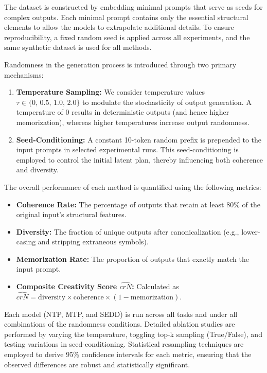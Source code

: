 \documentclass[12pt]{article}
\begin{document}
The dataset is constructed by embedding minimal prompts that serve as seeds for complex outputs. Each minimal prompt contains only the essential structural elements to allow the models to extrapolate additional details. To ensure reproducibility, a fixed random seed is applied across all experiments, and the same synthetic dataset is used for all methods.

Randomness in the generation process is introduced through two primary mechanisms:
\begin{enumerate}
    \item \textbf{Temperature Sampling:} We consider temperature values \(\tau \in \{0,\,0.5,\,1.0,\,2.0\}\) to modulate the stochasticity of output generation. A temperature of 0 results in deterministic outputs (and hence higher memorization), whereas higher temperatures increase output randomness.
    \item \textbf{Seed-Conditioning:} A constant 10-token random prefix is prepended to the input prompts in selected experimental runs. This seed-conditioning is employed to control the initial latent plan, thereby influencing both coherence and diversity.
\end{enumerate}

The overall performance of each method is quantified using the following metrics:
\begin{itemize}
    \item \textbf{Coherence Rate:} The percentage of outputs that retain at least 80\% of the original input's structural features.
    \item \textbf{Diversity:} The fraction of unique outputs after canonicalization (e.g., lower-casing and stripping extraneous symbols).
    \item \textbf{Memorization Rate:} The proportion of outputs that exactly match the input prompt.
    \item \textbf{Composite Creativity Score \(\hat{crN}\):} Calculated as \(\hat{crN} = \text{diversity} \times \text{coherence} \times (1-\text{memorization})\).
\end{itemize}

Each model (NTP, MTP, and SEDD) is run across all tasks and under all combinations of the randomness conditions. Detailed ablation studies are performed by varying the temperature, toggling top-k sampling (True/False), and testing variations in seed-conditioning. Statistical resampling techniques are employed to derive 95\% confidence intervals for each metric, ensuring that the observed differences are robust and statistically significant.
\end{document}
